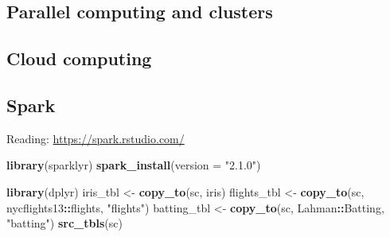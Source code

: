 \documentclass[]{book}
\newenvironment{Shaded}{\begin{snugshade}}{\end{snugshade}}
\newcommand{\KeywordTok}[1]{\textcolor[rgb]{0.13,0.29,0.53}{\textbf{#1}}}
\newcommand{\DataTypeTok}[1]{\textcolor[rgb]{0.13,0.29,0.53}{#1}}
\newcommand{\FloatTok}[1]{\textcolor[rgb]{0.00,0.00,0.81}{#1}}
\newcommand{\StringTok}[1]{\textcolor[rgb]{0.31,0.60,0.02}{#1}}
\newcommand{\OperatorTok}[1]{\textcolor[rgb]{0.81,0.36,0.00}{\textbf{#1}}}
\newcommand{\NormalTok}[1]{#1}
\theoremstyle{definition}
\theoremstyle{definition}
\theoremstyle{definition}
\theoremstyle{remark}
\begin{document}
\subsection{Parallel computing and
clusters}\label{parallel-computing-and-clusters}

\subsection{Cloud computing}\label{cloud-computing}

\subsection{Spark}\label{spark}

Reading: \url{https://spark.rstudio.com/}

\begin{Shaded}
\begin{Highlighting}[]
\KeywordTok{library}\NormalTok{(sparklyr)}
\KeywordTok{spark_install}\NormalTok{(}\DataTypeTok{version =} \StringTok{"2.1.0"}\NormalTok{)}
\end{Highlighting}
\end{Shaded}

\begin{Shaded}
\end{Shaded}

\begin{Shaded}
\begin{Highlighting}[]
\KeywordTok{library}\NormalTok{(dplyr)}
\NormalTok{iris_tbl <-}\StringTok{ }\KeywordTok{copy_to}\NormalTok{(sc, iris)}
\NormalTok{flights_tbl <-}\StringTok{ }\KeywordTok{copy_to}\NormalTok{(sc, nycflights13}\OperatorTok{::}\NormalTok{flights, }\StringTok{"flights"}\NormalTok{)}
\NormalTok{batting_tbl <-}\StringTok{ }\KeywordTok{copy_to}\NormalTok{(sc, Lahman}\OperatorTok{::}\NormalTok{Batting, }\StringTok{"batting"}\NormalTok{)}
\KeywordTok{src_tbls}\NormalTok{(sc)}
\end{Highlighting}
\end{Shaded}
\end{document}
